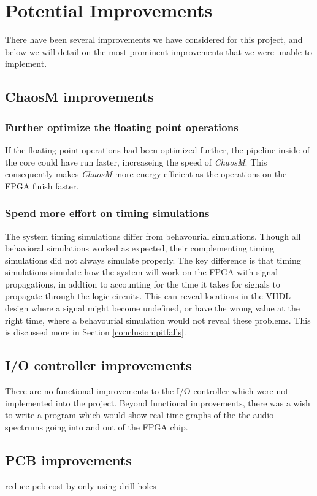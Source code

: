 \section{Potential Improvements}

There have been several improvements we have considered for this project, and
below we will detail on the most prominent improvements that we were unable to
implement.

\subsection{ChaosM improvements}
\subsubsection{Further optimize the floating point operations}

If the floating point operations had been optimized further, the pipeline inside
of the core could have run faster, increaseing the speed of
\textit{ChaosM}. This consequently makes \textit{ChaosM} more energy efficient as the operations on the FPGA finish faster.

\subsubsection{Spend more effort on timing simulations}

The system timing simulations differ from behavourial simulations. Though all behavioral 
simulations worked as expected, their complementing timing simulations did 
not always simulate properly.
The key difference is that timing simulations simulate how the system will work
on the FPGA with signal propagations, in addtion to accounting for the time it
takes for signals to propagate through the logic circuits. This can reveal
locations in the VHDL design where a signal might become undefined, or have the
wrong value at the right time, where a behavourial simulation would not reveal
these problems. This is discussed more in Section \ref{conclusion:pitfalls}.

\subsection{I/O controller improvements}

There are no functional improvements to the I/O controller which were not
implemented into the project. Beyond functional improvements, there was a
wish to write a program which would show real-time graphs of the the audio
spectrums going into and out of the FPGA chip.

\subsection{PCB improvements}
reduce pcb cost by only using drill holes -

